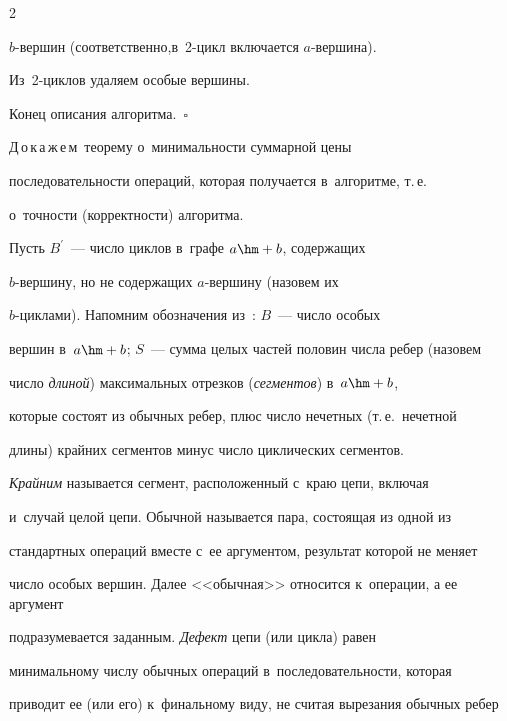 \begin{multicols}{2}
\begin{description}
$b$-вер\-шин (соответственно,\linebreak в~2-цикл включается $a$-вер\-ши\-на).  


Из~2-цик\-лов удаляем особые вершины.


  \end{description}


  


  Конец описания алгоритма.~$\square$


  \smallskip


  


  Д\,о\,к\,а\,ж\,е\,м\ теорему о~минимальности суммарной цены 


последовательности операций, которая получается в~алгоритме, т.\,е.\ 


о~точ\-ности (корректности) алгоритма. 


  


  Пусть $B^\prime$~--- число циклов в~графе $a\hm+b$, содержащих  


$b$-вер\-ши\-ну, но не содержащих $a$-вер\-ши\-ну (назовем их  


$b$-цик\-ла\-ми). Напомним обозначения из~\cite{2-gor}: $B$~--- число особых 


вершин в~$a\hm+b$; $S$~--- сумма целых частей половин числа ребер (назовем 


число \textit{длиной}) максимальных отрезков (\textit{сегментов}) в~$a\hm+b$, 


которые состоят из обычных ребер, плюс число нечетных (т.\,е.\ нечетной 


длины) крайних сегментов минус число циклических сегментов. 


\textit{Крайним} называется сегмент, расположенный с~краю цепи, включая 


и~случай целой цепи. Обычной называется пара, состоящая из одной из 


стандартных операций вместе с~ее аргументом, результат которой не меняет 


число особых вершин. Далее <<обычная>> относится к~операции, а ее аргумент 


подразумевается заданным. \textit{Дефект} цепи (или цикла) равен 


минимальному числу обычных операций в~последовательности, которая 


приводит ее (или его) к~финальному виду, не считая вырезания обычных ребер 



\end{multicols}
